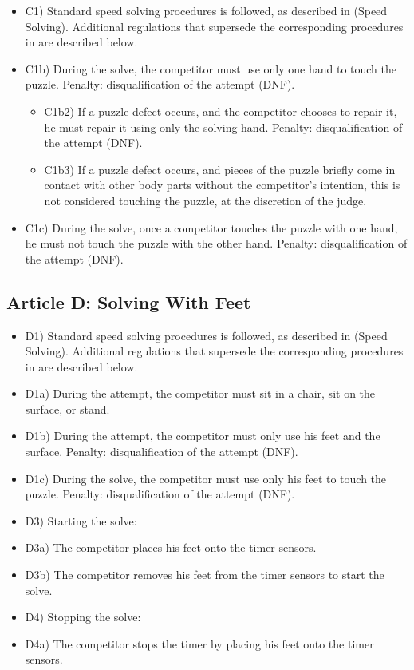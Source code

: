 \begin{itemize}
\item
  C1) Standard speed solving procedures is followed, as described in
  (Speed Solving). Additional regulations that supersede the
  corresponding procedures in are described below.
\item
  C1b) During the solve, the competitor must use only one hand to touch
  the puzzle. Penalty: disqualification of the attempt (DNF).

  \begin{itemize}
  \item
    C1b2) If a puzzle defect occurs, and the competitor chooses to
    repair it, he must repair it using only the solving hand. Penalty:
    disqualification of the attempt (DNF).
  \item
    C1b3) If a puzzle defect occurs, and pieces of the puzzle briefly
    come in contact with other body parts without the competitor's
    intention, this is not considered touching the puzzle, at the
    discretion of the judge.
  \end{itemize}
\item
  C1c) During the solve, once a competitor touches the puzzle with one
  hand, he must not touch the puzzle with the other hand. Penalty:
  disqualification of the attempt (DNF).
\end{itemize}

\subsection{ Article D: Solving With Feet}

\begin{itemize}
\item
  D1) Standard speed solving procedures is followed, as described in
  (Speed Solving). Additional regulations that supersede the
  corresponding procedures in are described below.
\item
  D1a) During the attempt, the competitor must sit in a chair, sit on
  the surface, or stand.
\item
  D1b) During the attempt, the competitor must only use his feet and the
  surface. Penalty: disqualification of the attempt (DNF).
\item
  D1c) During the solve, the competitor must use only his feet to touch
  the puzzle. Penalty: disqualification of the attempt (DNF).
\item
  D3) Starting the solve:
\item
  D3a) The competitor places his feet onto the timer sensors.
\item
  D3b) The competitor removes his feet from the timer sensors to start
  the solve.
\item
  D4) Stopping the solve:
\item
  D4a) The competitor stops the timer by placing his feet onto the timer
  sensors.
\end{itemize}

